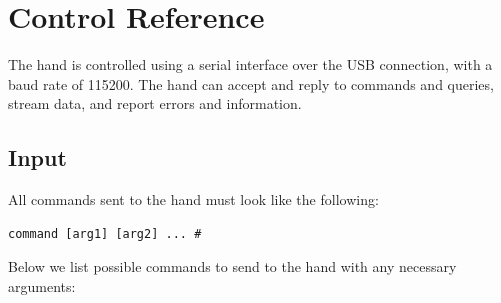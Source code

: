 \documentclass[letterpaper,notitlepage,10pt]{article}
\begin{document}
\pagebreak

\section{Control Reference}
The hand is controlled using a serial interface over the USB connection, with a baud rate of 115200. The hand can accept and reply to commands and queries, stream data, and report errors and information.

\subsection{Input}
All commands sent to the hand must look like the following:
\begin{verbatim}
command [arg1] [arg2] ... #
\end{verbatim}


\noindent Below we list possible commands to send to the hand with any necessary arguments:\\
\end{document}
